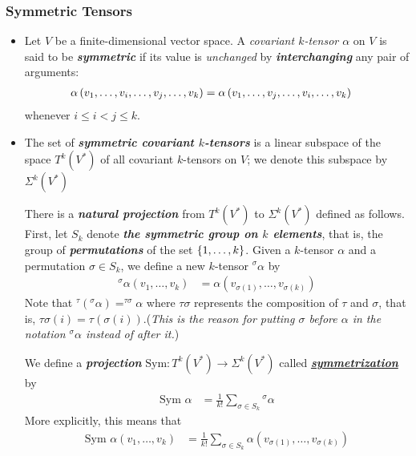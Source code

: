 \documentclass[11pt]{article}
\begin{document}
\subsubsection{Symmetric Tensors}
\begin{itemize}
\item  \begin{definition}
Let $V$ be a finite-dimensional vector space. A \emph{covariant $k$-tensor $\alpha$} on $V$ is said to be \emph{\textbf{symmetric}} if its value is \textit{unchanged} by \emph{\textbf{interchanging}} any pair of arguments:
\begin{align*}
\alpha\left(v_1, \ldots, v_i, \ldots, v_j, \ldots, v_k\right) &= \alpha\left(v_1, \ldots, v_j, \ldots, v_i, \ldots, v_k\right) 
\end{align*} whenever $i \le i< j \le k$.
\end{definition}

\item \begin{definition}
The set of \emph{\textbf{symmetric covariant $k$-tensors}} is a linear subspace of the space $T^k(V^{*})$ of all covariant $k$-tensors on $V$; we denote this subspace by \underline{$\Sigma^{k}(V^{*})$}

There is a \emph{\textbf{natural projection}} from $T^k(V^{*})$ to $\Sigma^{k}(V^{*})$ defined as follows. First, let
$S_k$ denote \emph{\textbf{the symmetric group on $k$ elements}}, that is, the group of \emph{\textbf{permutations}} of the set $\left\{1,\ldots,k\right\}$. Given a $k$-tensor $\alpha$ and a permutation $\sigma \in S_{k}$, we define a new $k$-tensor $^{\sigma}\alpha$ by
\begin{align*}
^{\sigma}\alpha(v_1, \ldots, v_k) &= \alpha(v_{\sigma(1)}, \ldots, v_{\sigma(k)})
\end{align*}
Note that $^{\tau}(^{\sigma}\alpha) = ^{\tau \sigma}\alpha$ where $\tau\sigma$ represents the composition of $\tau$ and $\sigma$, that is, $\tau\sigma(i) = \tau(\sigma(i))$.(\emph{This is the reason for putting $\sigma$ before $\alpha$ in the notation $^{\sigma}\alpha$ instead of after it.}) 

We define a \emph{\textbf{projection}} $\text{Sym}: T^k(V^{*}) \rightarrow \Sigma^{k}(V^{*})$ called \underline{\emph{\textbf{symmetrization}}} by
\begin{align*}
\text{Sym }\alpha &= \frac{1}{k!}\sum_{\sigma \in S_{k}}{^{\sigma}\alpha}
\end{align*}
More explicitly, this means that
\begin{align*}
\text{Sym }\alpha(v_1, \ldots, v_k) &= \frac{1}{k!}\sum_{\sigma \in S_{k}} \alpha(v_{\sigma(1)}, \ldots, v_{\sigma(k)})
\end{align*}
\end{definition}


\end{itemize}
\end{document}

